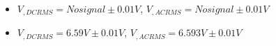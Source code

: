 \begin{itemize}
     \item $V_{, DCRMS}=No signal\pm 0.01\unit{V}$, $V_{, ACRMS}=No signal\pm 0.01\unit{V}$ 
     \item $V_{, DCRMS}=6.59V\pm 0.01\unit{V}$, $V_{, ACRMS}=6.593V\pm 0.01\unit{V}$\\
\end{itemize}